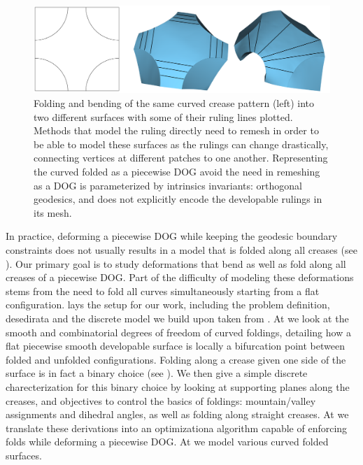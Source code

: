 \begin{figure} [h]
	\centering
	\includegraphics[width=\linewidth]{figures/rulings_problem_curve}
	\caption{Folding and bending of the same curved crease pattern (left) into two different surfaces with some of their ruling lines plotted. Methods that model the ruling directly need to remesh in order to be able to model these surfaces as the rulings can change drastically, connecting vertices at different patches to one another. Representing the curved folded as a piecewise DOG avoid the need in remeshing as a DOG is parameterized by intrinsics invariants: orthogonal geodesics, and does not explicitly encode the developable rulings in its mesh. }
	\label{fig:rulings_problem_curve}
\end{figure}

In practice, deforming a piecewise DOG while keeping the geodesic boundary constraints does not usually results in a model that is folded along all creases (see ). Our primary goal is to study deformations that bend as well as fold along all creases of a piecewise DOG. Part of the difficulty of modeling these deformations stems from the need to fold all curves simultaneously starting from a flat configuration.  lays the setup for our work, including the problem definition, desedirata and the discrete model we build upon taken from \cite{rabi18,rabi2018shape}. At  we look at the smooth and combinatorial degrees of freedom of curved foldings, detailing how a flat piecewise smooth developable surface is locally a bifurcation point between folded and unfolded configurations. Folding along a crease given one side of the surface is in fact a binary choice (see ). We then give a simple discrete charecterization for this binary choice by looking at supporting planes along the creases, and objectives to control the basics of foldings: mountain/valley assignments and dihedral angles, as well as folding along straight creases. At  we translate these derivations into an optimizationa algorithm capable of enforcing folds while deforming a piecewise DOG. At  we model various curved folded surfaces.


